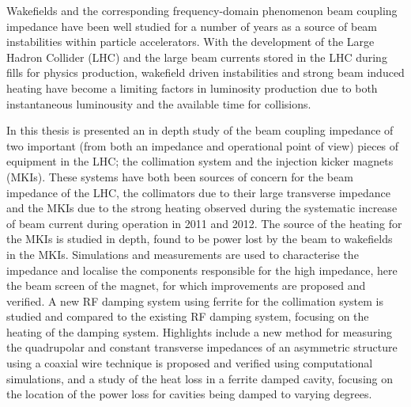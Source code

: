 Wakefields and the corresponding frequency-domain phenomenon beam coupling impedance have been well studied for a number of years as a source of beam instabilities within particle accelerators. With the development of the Large Hadron Collider (LHC) and the large beam currents stored in the LHC during fills for physics production, wakefield driven instabilities and strong beam induced heating have become a limiting factors in luminosity production due to both instantaneous luminousity and the available time for collisions.

In this thesis is presented an in depth study of the beam coupling impedance of two important (from both an impedance and operational point of view) pieces of equipment in the LHC; the collimation system and the injection kicker magnets (MKIs). These systems have both been sources of concern for the beam impedance of the LHC, the collimators due to their large transverse impedance and the MKIs due to the strong heating observed during the systematic increase of beam current during operation in 2011 and 2012. The source of the heating for the MKIs is studied in depth, found to be power lost by the beam to wakefields in the MKIs. Simulations and measurements are used to characterise the impedance and localise the components responsible for the high impedance, here the beam screen of the magnet, for which improvements are proposed and verified. A new RF damping system using ferrite for the collimation system is studied and compared to the existing RF damping system, focusing on the heating of the damping system. Highlights include a new method for measuring the quadrupolar and constant transverse impedances of an asymmetric structure using a coaxial wire technique is proposed and verified using computational simulations, and a study of the heat loss in a ferrite damped cavity, focusing on the location of the power loss for cavities being damped to varying degrees. 